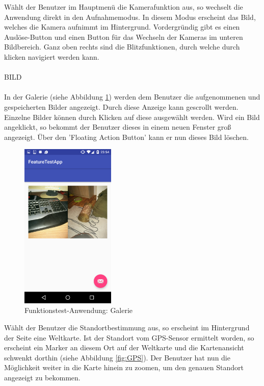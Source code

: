 Wählt der Benutzer im Hauptmenü die Kamerafunktion aus, so wechselt die Anwendung direkt in den Aufnahmemodus. In diesem Modus erscheint das Bild, welches die Kamera aufnimmt im Hintergrund. Vordergründig gibt es einen Auslöse-Button und einen Button für das Wechseln der Kameras im unteren Bildbereich. Ganz oben rechts sind die Blitzfunktionen, durch welche durch klicken navigiert werden kann. 
\\
\\
BILD
\\
\\
In der Galerie (siehe Abbildung \ref{fig:Gallery}) werden dem Benutzer die aufgenommenen und gespeicherten Bilder angezeigt. Durch diese Anzeige kann gescrollt werden. Einzelne Bilder können durch Klicken auf diese ausgewählt werden. Wird ein Bild angeklickt, so bekommt der Benutzer dieses in einem neuen Fenster groß angezeigt. Über den 'Floating Action Button' kann er nun dieses Bild löschen. 

\begin{figure}[h]
	\centering
	\includegraphics[width=0.4\textwidth]{Bilder/Screenshots/Screenshot_20170214-235454.PNG}
	\caption{Funktionstest-Anwendung: Galerie}
	\label{fig:Gallery}
\end{figure}

Wählt der Benutzer die Standortbestimmung aus, so erscheint im Hintergrund der Seite eine Weltkarte. Ist der Standort vom GPS-Sensor ermittelt worden, so erscheint ein Marker an diesem Ort auf der Weltkarte und die Kartenansicht schwenkt dorthin (siehe Abbildung \ref{fig:GPS}). Der Benutzer hat nun die Möglichkeit weiter in die Karte hinein zu zoomen, um den genauen Standort angezeigt zu bekommen. 
\clearpage

